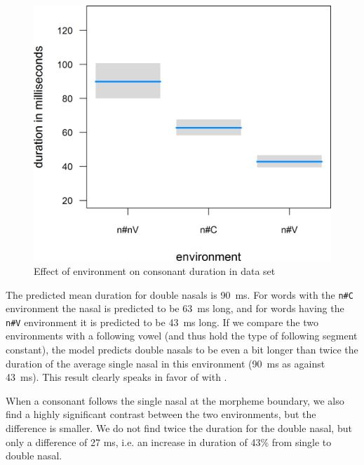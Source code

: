 \begin{figure}
	\includegraphics [scale=0.4] {images/Corpus/unModelNumNasal.png}
	\caption{Effect of environment on consonant duration in data set}
	\label{fig:NumNasal un}
\end{figure}

The predicted mean duration for double nasals is 90~ms. For words with the \texttt{n\#C} environment the nasal is predicted to be 63~ms long, and for words having the \texttt{n\#V} environment it is predicted to be 43~ms long. If we compare the two environments with a following vowel (and thus hold the type of following segment constant), the model predicts double nasals to be even a bit longer than twice the duration of the average single nasal in this environment (90~ms as against 43~ms). This result clearly speaks in favor of  with .

When a consonant follows the single nasal at the morpheme boundary, we also find a highly significant contrast between the two environments, but the difference is smaller. We do not find twice the duration for the double nasal, but only a difference of 27 ms, i.e. an increase in duration of 43\% from single to double nasal. 

